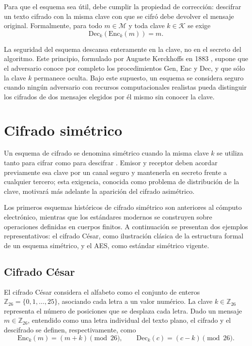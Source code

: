 Para que el esquema sea útil, debe cumplir la propiedad de corrección: descifrar un texto cifrado con la misma clave con que se cifró debe devolver el mensaje original. Formalmente, para todo $m \in \mathcal{M}$ y toda clave $k \in \mathcal{K}$ se exige
\begin{equation}
    \text{Dec}_k(\text{Enc}_k(m)) = m.
    \label{eq:correctness}
\end{equation}

La seguridad del esquema descansa enteramente en la clave, no en el secreto del algoritmo. Este principio, formulado por Auguste Kerckhoffs en 1883 \cite{Kerckhoffs1883}, supone que el adversario conoce por completo los procedimientos $\text{Gen}$, $\text{Enc}$ y $\text{Dec}$, y que sólo la clave $k$ permanece oculta. Bajo este supuesto, un esquema se considera seguro cuando ningún adversario con recursos computacionales realistas pueda distinguir los cifrados de dos mensajes elegidos por él mismo sin conocer la clave.

\section{Cifrado simétrico}

Un esquema de cifrado se denomina simétrico cuando la misma clave $k$ se utiliza tanto para cifrar como para descifrar \cite{KatzLindell}. Emisor y receptor deben acordar previamente esa clave por un canal seguro y mantenerla en secreto frente a cualquier tercero; esta exigencia, conocida como problema de distribución de la clave, motivará más adelante la aparición del cifrado asimétrico.

Los primeros esquemas históricos de cifrado simétrico son anteriores al cómputo electrónico, mientras que los estándares modernos se construyen sobre operaciones definidas en cuerpos finitos. A continuación se presentan dos ejemplos representativos: el cifrado César, como ilustración clásica de la estructura formal de un esquema simétrico, y el AES, como estándar simétrico vigente.

\subsection{Cifrado César}

El cifrado César considera el alfabeto como el conjunto de enteros $\mathbb{Z}_{26} = \{0, 1, \dots, 25\}$, asociando cada letra a un valor numérico. La clave $k \in \mathbb{Z}_{26}$ representa el número de posiciones que se desplaza cada letra. Dado un mensaje $m \in \mathbb{Z}_{26}$, entendido como una letra individual del texto plano, el cifrado y el descifrado se definen, respectivamente, como
\begin{equation}
    \text{Enc}_k(m) = (m + k) \pmod{26}, \qquad \text{Dec}_k(c) = (c - k) \pmod{26}.
\end{equation}

